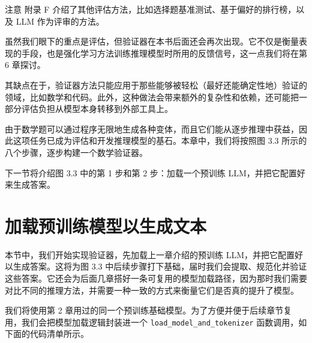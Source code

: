 
\begin{myWarning}{注意}
 附录 F 介绍了其他评估方法，比如选择题基准测试、基于偏好的排行榜，以及 LLM 作为评审的方法。\end{myWarning}

虽然我们眼下的重点是评估，但验证器在本书后面还会再次出现。它不仅是衡量表现的手段，也是强化学习方法训练推理模型时所用的反馈信号，这一点我们将在第 6 章探讨。

其缺点在于，验证器方法只能应用于那些能够被轻松（最好还能确定性地）验证的领域，比如数学和代码。此外，这种做法会带来额外的复杂性和依赖，还可能把一部分评估负担从模型本身转移到外部工具上。

由于数学题可以通过程序无限地生成各种变体，而且它们能从逐步推理中获益，因此这项任务已成为评估和开发推理模型的基石。本章中，我们将按照图 3.3 所示的八个步骤，逐步构建一个数学验证器。


下一节将介绍图 3.3 中的第 1 步和第 2 步：加载一个预训练 LLM，并把它配置好来生成答案。

\section{加载预训练模型以生成文本}

本节中，我们开始实现验证器，先加载上一章介绍的预训练 LLM，并把它配置好以生成答案。这将为图 3.3 中后续步骤打下基础，届时我们会提取、规范化并验证这些答案。它还会为后面几章搭好一条可复用的模型加载路径，因为那时我们需要对比不同的推理方法，并需要一种一致的方式来衡量它们是否真的提升了模型。

我们将使用第 2 章用过的同一个预训练基础模型。为了方便并便于后续章节复用，我们会把模型加载逻辑封装进一个 \texttt{load\_model\_and\_tokenizer} 函数调用，如下面的代码清单所示。

